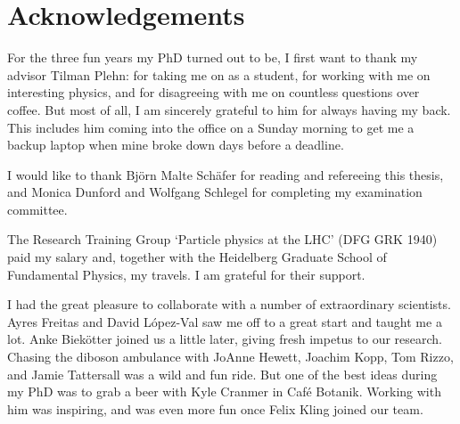
\chapter*{Acknowledgements}




For the three fun years my PhD turned out to be, I first want to
thank my advisor Tilman Plehn: for taking me on as a student, for
working with me on interesting physics, and for disagreeing with me on
countless questions over coffee. But most of all, I am sincerely
grateful to him for always having my back. This includes him coming
into the office on a Sunday morning to get me a backup laptop when
mine broke down days before a deadline.
%
%
%

I would like to thank Bj\"orn Malte Sch\"afer for reading and
refereeing this thesis, and Monica Dunford and Wolfgang Schlegel for
completing my examination committee.
%

The Research Training Group `Particle physics at the LHC' (DFG GRK
1940) paid my salary and, together with the Heidelberg Graduate School
of Fundamental Physics, my travels. I am grateful for their support.

I had the great pleasure to collaborate with a number of extraordinary
scientists. Ayres Freitas and David L\'opez-Val saw me off to a great
start and taught me a lot. Anke Biek\"otter joined us a little later,
giving fresh impetus to our research. Chasing the diboson ambulance
with JoAnne Hewett, Joachim Kopp, Tom Rizzo, and Jamie Tattersall was
a wild and fun ride. But one of the best ideas during my PhD was to
grab a beer with Kyle Cranmer in Caf\'e Botanik. Working with him was
inspiring, and was even more fun once Felix Kling joined our team.

